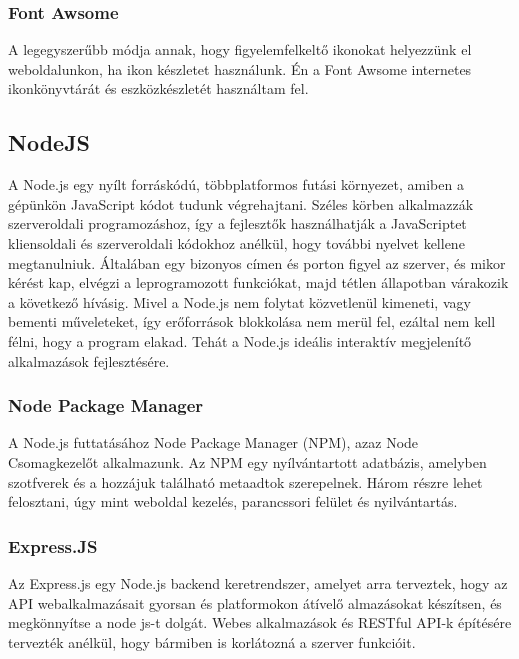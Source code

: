 \subsubsection{Font Awsome}

A legegyszerűbb módja annak, hogy figyelemfelkeltő ikonokat helyezzünk el weboldalunkon, ha ikon készletet használunk. Én a Font Awsome internetes ikonkönyvtárát és eszközkészletét használtam fel.

\subsection{NodeJS }

A Node.js egy nyílt forráskódú, többplatformos futási környezet, amiben a gépünkön JavaScript kódot tudunk végrehajtani. Széles körben alkalmazzák szerveroldali programozáshoz, így a fejlesztők használhatják a JavaScriptet kliensoldali és szerveroldali kódokhoz anélkül, hogy további nyelvet kellene megtanulniuk. Általában egy bizonyos címen és porton figyel az szerver, és mikor kérést kap, elvégzi a leprogramozott funkciókat, majd tétlen állapotban várakozik a következő hívásig. Mivel a Node.js nem folytat közvetlenül kimeneti, vagy bementi műveleteket, így erőforrások blokkolása nem merül fel, ezáltal nem kell félni, hogy a program elakad. Tehát a Node.js ideális interaktív megjelenítő alkalmazások fejlesztésére. \cite{nodeJS}

\subsubsection{Node Package Manager}

A Node.js futtatásához Node Package Manager (NPM), azaz Node Csomagkezelőt alkalmazunk. Az NPM egy nyílvántartott adatbázis, amelyben szotfverek és a hozzájuk található metaadtok szerepelnek. Három részre lehet felosztani, úgy mint weboldal kezelés, parancssori felület és nyilvántartás.

\subsubsection{Express.JS}

Az Express.js egy Node.js backend keretrendszer, amelyet arra terveztek, hogy az API webalkalmazásait gyorsan és platformokon átívelő almazásokat készítsen, és megkönnyítse a node js-t dolgát. Webes alkalmazások és RESTful API-k építésére tervezték anélkül, hogy bármiben is korlátozná a szerver funkcióit.

